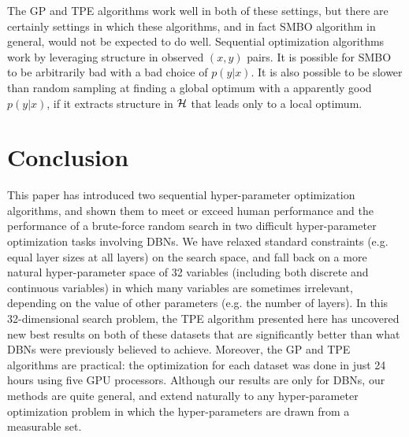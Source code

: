 \documentclass{article}
\newcommand{\vs}[1]{\vspace*{-#1mm}}
\newcommand{\Bs}{\vs{2}}
\newcommand{\as}{\vs{1}}
\renewcommand{\citet}{\cite}
\begin{document}

The GP and TPE algorithms work well in both of these settings,
but there are certainly settings in which these algorithms, and in fact SMBO
algorithm in general, would not be expected to do well.
Sequential optimization algorithms work by leveraging structure in observed
$(x,y)$ pairs.
It is possible for SMBO to be arbitrarily bad with a bad choice of $p(y|x)$.
It is also possible to be slower than random sampling at finding a global
optimum with a apparently good $p(y|x)$,
if it extracts structure in ${\cal H}$ that leads only to a local optimum.




\Bs
\section{Conclusion}
\label{sec:conclusion}
\as

This paper has introduced two sequential hyper-parameter optimization algorithms,
and shown them to meet or exceed human performance and the performance of a brute-force random search
in two difficult hyper-parameter optimization tasks involving DBNs.
We have relaxed standard constraints (e.g. equal layer sizes at all layers) on the search space,
and fall back on a more natural hyper-parameter space of 32 variables
(including both discrete and continuous variables)
in which many variables are sometimes irrelevant,
depending on the value of other parameters (e.g. the number of layers).
In this 32-dimensional search problem,
the TPE algorithm presented here has uncovered new best results on both of these datasets that are significantly better than what DBNs were previously believed to achieve.
Moreover, the GP and TPE algorithms are practical: the optimization for each dataset was done in just 24 hours using five GPU processors.
Although our results are only for DBNs, our methods are quite general,
and extend naturally to any hyper-parameter optimization problem in which the hyper-parameters are drawn from a measurable set.
\end{document}
